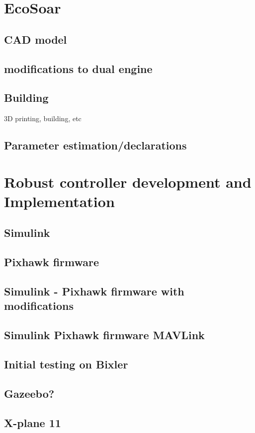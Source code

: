 \documentclass{article}
\begin{document}
\section{EcoSoar}
\subsection{CAD model}
\subsection{modifications to dual engine}
\subsection{Building}
3D printing, building, etc
\subsection{Parameter estimation/declarations}

\section{\textbf{Robust controller development and Implementation}}
\subsection{Simulink}
\subsection{Pixhawk firmware}
\subsection{Simulink - Pixhawk firmware with modifications}
\subsection{Simulink Pixhawk firmware MAVLink}
\subsection{Initial testing on Bixler}
\subsection{Gazeebo?}
\subsection{X-plane 11}
\end{document}
